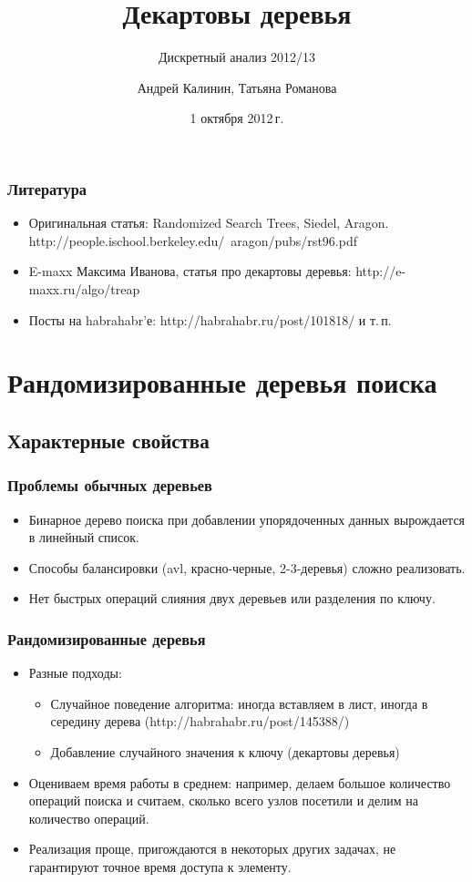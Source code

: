 \documentclass[hyperref={unicode=true}]{beamer}
\title{Декартовы деревья}
\subtitle{Дискретный анализ 2012/13}
\author{Андрей Калинин, Татьяна Романова}
\date{1 октября 2012\,г. }
\begin{document}
\newcommand{\tnd}[1]{\Tcircle{\makebox[5mm][c]{#1}}}
\newcommand{\nilnd} {\Tp[edge=none]}
\newcommand{\rednd}[1]{\Tcircle[linecolor=red!30, %
    fillstyle=solid, fillcolor=red!30] {\makebox[5mm][c]{#1}}}
\newcommand{\blacknd}[1]{\Tcircle[linecolor=black!20, %
    fillstyle=solid, fillcolor=black!20]{\makebox[5mm][c]{#1}}}

\frame {\titlepage}

\frame
{
  \frametitle{Литература}

  \begin{itemize}
  \item Оригинальная статья: Randomized Search Trees, Siedel, Aragon. http://people.ischool.berkeley.edu/~aragon/pubs/rst96.pdf 
  \item E-maxx Максима Иванова, статья про декартовы деревья: http://e-maxx.ru/algo/treap
  \item Посты на habrahabr'е: http://habrahabr.ru/post/101818/ и т.\,п.
  \end{itemize}
}


\section{Рандомизированные деревья поиска}
\subsection{Характерные свойства}

\frame
{
  \frametitle{Проблемы обычных деревьев}
  \begin{itemize}
    \item Бинарное дерево поиска при добавлении упорядоченных данных вырождается в линейный список.
    \item Способы балансировки (avl, красно-черные, 2-3-деревья) сложно реализовать.
    \item Нет быстрых операций слияния двух деревьев или разделения по ключу.
  \end{itemize}
}

\frame
{
  \frametitle{Рандомизированные деревья}
  \begin{itemize}
    \item Разные подходы:
       \begin{itemize}
         \item Случайное поведение алгоритма: иногда вставляем в лист, иногда в середину дерева (http://habrahabr.ru/post/145388/)
         \item Добавление случайного значения к ключу (декартовы деревья)
       \end{itemize}
     \item Оцениваем время работы в среднем: например, делаем большое количество операций поиска и считаем, сколько всего узлов посетили и делим на количество операций.
     \item Реализация проще, пригождаются в некоторых других задачах, не гарантируют точное время доступа к элементу.
  \end{itemize}
}
\end{document}
